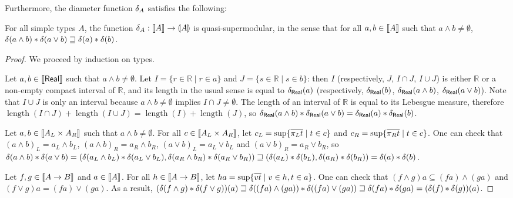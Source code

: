 Furthermore, the diameter function $\delta_{A}$ satisfies the following:
\begin{proposition} For all simple types $A$, the function $\delta_A : \llbracket A \rrbracket \to \llparenthesis A \rrparenthesis$ is quasi-supermodular, in the sense that for all $a,b \in \llbracket A \rrbracket$ such that $a \wedge b \neq \emptyset$, $\delta(a \wedge b) \mathbin{\ast} \delta(a \vee b) \sqsupseteq \delta(a) \mathbin{\ast} \delta(b)$.
\end{proposition}
\begin{proof}
We proceed by induction on types.

Let $a,b \in \llbracket \mathsf{Real} \rrbracket$ such that $a\wedge b \neq \emptyset$. Let $I = \{r \in \mathbb{R} \mid r \in a\}$ and $J = \{s \in \mathbb{R} \mid s \in b\}$: then $I$ (respectively, $J$, $I \cap J$, $I \cup J$) is either $\mathbb{R}$ or a non-empty compact interval of $\mathbb{R}$, and its length in the usual sense is equal to $\delta_\mathsf{Real}(a)$ (respectively, $\delta_\mathsf{Real}(b)$, $\delta_\mathsf{Real}(a \wedge b)$, $\delta_\mathsf{Real}(a \vee b)$). Note that $I \cup J$ is only an interval because $a\wedge b \neq \emptyset$ implies $I \cap J \neq \emptyset$. The length of an interval of $\mathbb{R}$ is equal to its Lebesgue measure, therefore $\operatorname{length}(I \cap J) + \operatorname{length}(I \cup J) = \operatorname{length}(I) + \operatorname{length}(J)$, so $\delta_\mathsf{Real}(a \wedge b) \mathbin{\ast} \delta_\mathsf{Real}(a \vee b) = \delta_\mathsf{Real}(a) \mathbin{\ast} \delta_\mathsf{Real}(b)$.

Let $a,b \in \llbracket A_L \times A_R \rrbracket$ such that $a\wedge b \neq \emptyset$. For all $c \in \llbracket A_L \times A_R \rrbracket$, let $c_L = \sup\{\overline{\pi_L t} \mid t \in c\}$ and $c_R = \sup\{\overline{\pi_R t} \mid t \in c\}$.
One can check that $(a \wedge b)_L = a_L \wedge b_L$, $(a \wedge b)_R = a_R \wedge b_R$, $(a \vee b)_L = a_L \vee b_L$ and $(a \vee b)_R = a_R \vee b_R$, so $\delta(a \wedge b) \mathbin{\ast} \delta(a \vee b) = (\delta(a_L \wedge b_L) \mathbin{\ast} \delta(a_L \vee b_L),  \delta(a_R \wedge b_R) \mathbin{\ast} \delta(a_R \vee b_R)) \sqsupseteq (\delta(a_L) \mathbin{\ast} \delta(b_L), \delta(a_R) \mathbin{\ast} \delta(b_R)) = \delta(a) \mathbin{\ast} \delta(b)$.

Let $f,g \in \llbracket A \to B \rrbracket$ and $a \in \llbracket A \rrbracket$. For all $h \in \llbracket A \to B \rrbracket$, let $ha = \sup\{\overline{vt} \mid v \in h, t \in a\}$. One can check that $(f \wedge g)a \subseteq (f a) \wedge (g a)$ and $(f \vee g)a = (f a) \vee (g a)$. As a result, $(\delta(f \wedge g)\mathbin{\ast} \delta(f \vee g))(a) \sqsupseteq \delta((fa) \wedge (ga)) \mathbin{\ast} \delta((fa) \vee (ga)) \sqsupseteq \delta(fa) \mathbin{\ast} \delta(ga) = (\delta(f)\mathbin{\ast}\delta(g))(a)$.
\end{proof}

